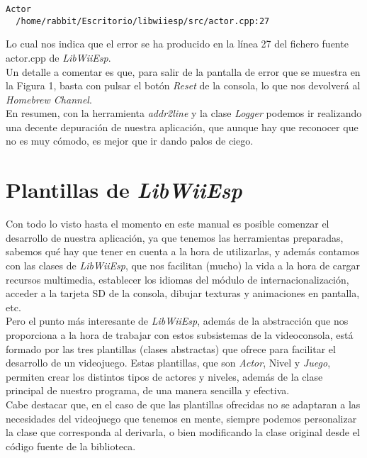 \begin{lstlisting}[style=consola]
  Actor
  /home/rabbit/Escritorio/libwiiesp/src/actor.cpp:27
\end{lstlisting}

Lo cual nos indica que el error se ha producido en la línea 27 del fichero fuente actor.cpp de \emph{LibWiiEsp}.\\

Un detalle a comentar es que, para salir de la pantalla de error que se muestra en la Figura 1, basta con pulsar el botón \emph{Reset} de la consola, lo que nos devolverá al \emph{Homebrew Channel}. \\

En resumen, con la herramienta \emph{addr2line} y la clase \emph{Logger} podemos ir realizando una decente depuración de nuestra aplicación, que aunque hay que reconocer que no es muy cómodo, es mejor que ir dando palos de ciego.

\section{Plantillas de \emph{LibWiiEsp}}

Con todo lo visto hasta el momento en este manual es posible comenzar el desarrollo de nuestra aplicación, ya que tenemos las herramientas preparadas, sabemos qué hay que tener en cuenta a la hora de utilizarlas, y además contamos con las clases de \emph{LibWiiEsp}, que nos facilitan (mucho) la vida a la hora de cargar recursos multimedia, establecer los idiomas del módulo de internacionalización, acceder a la tarjeta SD de la consola, dibujar texturas y animaciones en pantalla, etc.\\

Pero el punto más interesante de \emph{LibWiiEsp}, además de la abstracción que nos proporciona a la hora de trabajar con estos subsistemas de la videoconsola, está formado por las tres plantillas (clases abstractas) que ofrece para facilitar el desarrollo de un videojuego. Estas plantillas, que son \emph{Actor}, \emph{}Nivel y \emph{Juego}, permiten crear los distintos tipos de actores y niveles, además de la clase principal de nuestro programa, de una manera sencilla y efectiva.\\

Cabe destacar que, en el caso de que las plantillas ofrecidas no se adaptaran a las necesidades del videojuego que tenemos en mente, siempre podemos personalizar la clase que corresponda al derivarla, o bien modificando la clase original desde el código fuente de la biblioteca.\\

